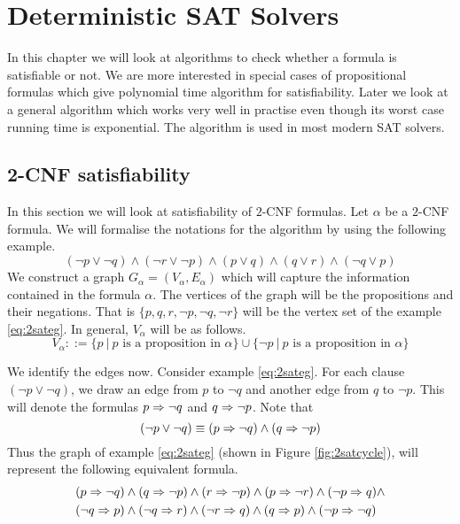 \chapter{Deterministic SAT Solvers}
In this chapter we will look at algorithms to check whether a formula is satisfiable or not. We are more interested in special cases of propositional formulas which give polynomial time algorithm for satisfiability. Later we look at a general algorithm which works very well in practise even though its worst case running time is exponential. The algorithm is used in most modern SAT solvers.
\section{2-CNF satisfiability}
In this section we will look at satisfiability of $2$-CNF formulas. Let $\alpha$ be a $2$-CNF formula. We will formalise the notations for the algorithm by using the following example.
\begin{equation}
 (\neg p \vee \neg q) \wedge (\neg r \vee \neg p) \wedge (p \vee q) \wedge (q \vee r) \wedge (\neg q \vee p)
 \label{eq:2sateg}
\end{equation}
We construct a graph $G_{\alpha}=(V_{\alpha},E_{\alpha})$ which will capture the information contained in the formula $\alpha$. The vertices of the graph will be the propositions and their negations. That is $\{p,q,r,\neg p, \neg q, \neg r\}$ will be the vertex set of the example \ref{eq:2sateg}. In general, $V_{\alpha}$ will be as follows.
\[
V_{\alpha} ::= \{p ~|~ p \text{ is a proposition in } \alpha \} \cup \{\neg p ~|~ p \text { is a proposition in } \alpha \}
\]

We identify the edges now. Consider example \ref{eq:2sateg}. For each clause $(\neg p \vee \neg q)$, we draw an edge from $p$ to $\neg q$ and another edge from $q$ to $\neg p$. This will denote the formulas $p \Rightarrow \neg q$ and $q \Rightarrow \neg p$. Note that
\[
(\neg p \vee \neg q) \equiv (p \Rightarrow \neg q) \wedge (q \Rightarrow \neg p)
\]
Thus the graph of example  \ref{eq:2sateg} (shown in Figure \ref{fig:2satcycle}), will represent the following equivalent formula.
\begin{align}
& (p \Rightarrow \neg q) \wedge (q \Rightarrow \neg p) \wedge (r \Rightarrow \neg p) \wedge (p \Rightarrow \neg r) \wedge  (\neg p \Rightarrow q) \wedge \notag \\
&  (\neg q \Rightarrow p) \wedge (\neg q \Rightarrow r) \wedge (\neg r \Rightarrow q) \wedge (q \Rightarrow p) \wedge (\neg p \Rightarrow \neg q) \label{eq:2sateqeg}
\end{align}

